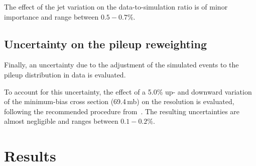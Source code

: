 The effect of the jet \pt variation on the data-to-simulation ratio is of minor importance and range between $0.5-0.7\%$.


\section*{Uncertainty on the pileup reweighting}
Finally, an uncertainty due to the adjustment of the simulated events to the pileup distribution in data is evaluated.

To account for this uncertainty, the effect of a 5.0\% up- and downward variation of the minimum-bias cross section (69.4\,mb) on the resolution is evaluated, following the recommended procedure from~\cite{bib:CMS:PileupSysUnc}.
The resulting uncertainties are almost negligible and ranges between $0.1-0.2\%$.

\FloatBarrier
\chapter{Results}
\label{res:ch:results}

